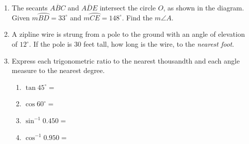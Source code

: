 \documentclass[12pt, twoside]{article}
\begin{document}
\begin{enumerate}
  \item The secants $\overline{ABC}$ and $\overline{ADE}$ intersect the circle $O$, as shown in the diagram. \\Given $m \wideparen{BD}=33^\circ$ and $m \wideparen{CE}=148^\circ$. Find the $m\angle A$.
       \begin{center}
      \end{center}
\newpage

  \item A zipline wire is strung from a pole to the ground with an angle of elevation of $12^\circ$. If the pole is 30 feet tall, how long is the wire, to the \emph{nearest foot}.\\[0.25cm]
   \vspace{4cm}

  \item Express each trigonometric ratio to the nearest thousandth and each angle measure to the nearest degree.
    \begin{multicols}{2}
      \begin{enumerate}
        \item $\tan 45^\circ =$ \vspace{0.5cm}
        \item $\cos 60^\circ =$
        \item $\sin^{-1} 0.450 =$ \vspace{0.5cm}
        \item $\cos^{-1} 0.950 =$
      \end{enumerate}
    \end{multicols} \vspace{0.25cm}


\end{enumerate}
\end{document}
